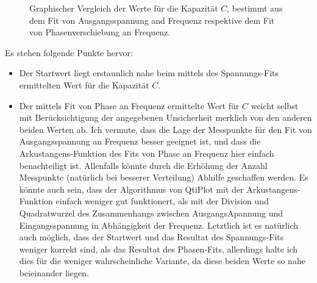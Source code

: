 \vspace*{2em}
\begin{figure}[th!]
\centering
{}
\caption{
    Graphischer  Vergleich  der  Werte  f\"ur die  Kapazit\"at  $C$,  bestimmt
    aus  dem Fit  von Ausgangsspannung  and  Frequenz respektive  dem Fit  von
    Phasenverschiebung an Frequenz.
}
\label{fig:rcglied:results}
\end{figure}

Es stehen folgende Punkte hervor:
\begin{itemize}
    \item
        Der Startwert  liegt erstaunlich nahe beim  mittels des Spannungs-Fits
        ermittelten Wert f\"ur die Kapazit\"at $C$.
    \item
        Der mittels Fit von Phase an Frequenz ermittelte Wert f\"ur $C$ weicht
        selbst  mit Ber\"ucksichtigung  der angegebenen  Unsicherheit merklich
        von  den anderen  beiden Werten  ab. Ich  vermute, dass  die Lage  der
        Messpunkte  f\"ur  den Fit  von  Ausgangsspannung  an Frequenz  besser
        geeignet ist,  und dass die  Arkustangens-Funktion des Fits  von Phase
        an   Frequenz  hier  einfach  benachteiligt  ist. Allenfalls  k\"onnte
        durch die  Erh\"ohung der Anzahl Messpunkte  (nat\"urlich bei besserer
        Verteilung) Abhilfe geschaffen werden.
        Es  k\"onnte auch  sein,  dass  der Algorithmus  von  QtiPlot mit  der
        Arkustangens-Funktion  einfach weniger  gut funktionert,  als mit  der
        Division und Quadratwurzel des Zusammenhangs zwischen AusgangsApannung
        und Eingangsspannung  in Abh\"angigkeit  der Frequenz.
        Letztlich  ist  es  nat\"urlich  auch m\"oglich,  dass  der  Startwert
        und  das Resultat  des Spannungs-Fits  weniger korrekt  sind, als  das
        Resultat des Phasen-Fits, allerdings halte  ich dies f\"ur die weniger
        wahrscheinliche Variante,  da diese  beiden Werte so  nahe beieinander
        liegen.
\end{itemize}
